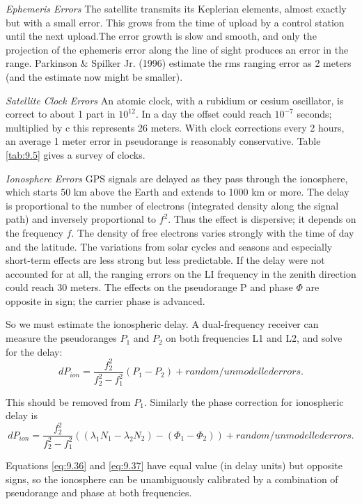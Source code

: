 		\textit{Ephemeris Errors} The satellite transmits its Keplerian elements, almost exactly but with a small error. This grows from the time of upload by a control station until the next upload.The error growth is slow and smooth, and only the projection of the ephemeris error along the line of sight produces an error in the range. Parkinson $\&$ Spilker Jr. (1996) estimate the rms ranging error as 2 meters (and the estimate now might be smaller).
		
		\textit{Satellite Clock Errors} An atomic clock, with a rubidium or cesium oscillator, is correct to about 1 part in $10^{12}$. In a day the offset could reach $10^{-7}$ seconds; multiplied by c this represents 26 meters. With clock corrections every 2 hours, an average 1 meter error in pseudorange is reasonably conservative. Table \ref{tab:9.5} gives a survey of clocks.
		
		\textit{Ionosphere Errors} GPS signals are delayed as they pass through the ionosphere, which starts 50 km above the Earth and extends to 1000 km or more. The delay is proportional to the number of electrons (integrated density along the signal path) and inversely proportional to $f^2$. Thus the effect is dispersive; it depends on the frequency $f$. The density of free electrons varies strongly with the time of day and the latitude. The variations from solar cycles and seasons and especially short-term effects are less strong but less predictable. If the delay were not accounted for at all, the ranging errors on the LI frequency in the zenith direction could reach 30 meters. The effects on the pseudorange P and phase $\Phi$ are opposite in sign; the carrier phase is advanced. 
		
		So we must estimate the ionospheric delay. A dual-frequency receiver can measure the pseudoranges $P_1$ and $P_2$ on both frequencies L1 and L2, and solve for the delay:
		\begin{equation}\label{eq:9.36}
			dP_{ion} = \dfrac{f^2_2}{f^2_2-f^2_1}(P_1-P_2)+random/unmodelled errors.
		\end{equation}
		
		This should be removed from $P_1$. Similarly the phase correction for ionospheric delay is
		\begin{equation}\label{eq:9.37}
			dP_{ion} = \dfrac{f^2_2}{f^2_2-f^2_1}((\lambda_1N_1-\lambda_2N_2)-(\Phi_1-\Phi_2))+random/unmodelled errors.
		\end{equation}
		
		Equations \ref{eq:9.36} and \ref{eq:9.37} have equal value (in delay units) but opposite signs, so the ionosphere can be unambiguously calibrated by a combination of pseudorange and phase at both frequencies.
		
